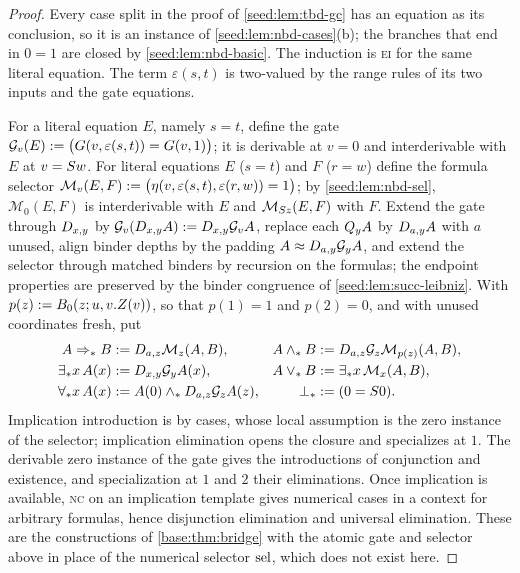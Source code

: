 \begin{proof}
Every case split in the proof of \cref{seed:lem:tbd-gc} has an equation as
its conclusion, so it is an instance of \cref{seed:lem:nbd-cases}(b); the
branches that end in $0=1$ are closed by \cref{seed:lem:nbd-basic}. The
induction is \textsc{ei} for the same literal equation. The term
$\varepsilon(s,t)$ is two-valued by the range rules of its two inputs and
the gate equations.

For a literal equation $E$, namely $s=t$, define the gate
$\mathcal G_v(E)\mathrel{:=}\bigl(G(v,\varepsilon(s,t))=G(v,1)\bigr)$; it is
derivable at $v=0$ and interderivable with $E$ at $v=S w$. For literal
equations $E$ ($s=t$) and $F$ ($r=w$) define the formula selector
$\mathcal M_v(E,F)\mathrel{:=}\bigl(\eta(v,\varepsilon(s,t),\varepsilon(r,w))=1
\bigr)$; by \cref{seed:lem:nbd-sel}, $\mathcal M_0(E,F)$ is interderivable
with $E$ and $\mathcal M_{S z}(E,F)$ with $F$. Extend the gate through
$D_{x,y}$ by $\mathcal G_v(D_{x,y}A)\mathrel{:=}D_{x,y}\mathcal G_vA$, replace
each $Q_{y}A$ by $D_{a,y}A$ with $a$ unused, align binder depths by the
padding $A\approx D_{a,y}\mathcal G_yA$, and extend the selector through
matched binders by recursion on the formulas; the endpoint properties are
preserved by the binder congruence of \cref{seed:lem:succ-leibniz}. With
$p(z)\mathrel{:=} B_0(z;u,v.Z(v))$, so that $p(1)=1$ and $p(2)=0$, and with unused
coordinates fresh, put
\begin{align*}
 A\Rightarrow_*B&\mathrel{:=}D_{a,z}\mathcal M_z(A,B), &
 A\land_*B&\mathrel{:=}D_{a,z}\mathcal G_z\mathcal M_{p(z)}(A,B),\\
 \exists_*x\,A(x)&\mathrel{:=}D_{x,y}\mathcal G_yA(x), &
 A\lor_*B&\mathrel{:=}\exists_*x\,\mathcal M_x(A,B),\\
 \forall_*x\,A(x)&\mathrel{:=} A(0)\land_*D_{a,z}\mathcal G_zA(z), &
 \bot_*&\mathrel{:=}(0=S 0).
\end{align*}
Implication introduction is  by cases, whose local assumption
is the zero instance of the selector; implication elimination opens the
closure and specializes at $1$. The derivable zero instance of the gate
gives the introductions of conjunction and existence, and specialization at
$1$ and $2$ their eliminations. Once implication is available, \textsc{nc}
on an implication template gives numerical cases in a context for arbitrary
formulas, hence disjunction elimination and universal elimination. These are
the constructions of \cref{base:thm:bridge} with the atomic gate and
selector above in place of the numerical selector $\operatorname{sel}$, which does not
exist here.


\end{proof}
